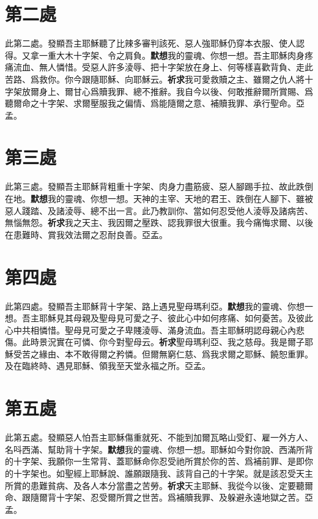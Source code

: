 \section*{第二處}
此第二處。發顯吾主耶穌聽了比辣多審判該死、惡人強耶穌仍穿本衣服、使人認得。又拿一重大木十字架、令之肩負。\cspace\textbf{默想}我的靈魂、你想一想。吾主耶穌肉身疼痛流血、無人憐惜。受惡人許多淩辱、把十字架放在身上、何等樣喜歡背負、走此苦路、爲救你。你今跟隨耶穌、向耶穌云。\cspace\textbf{祈求}我可愛救贖之主、雖爾之仇人將十字架放爾身上、爾甘心爲贖我罪、總不推辭。我自今以後、何敢推辭爾所賞賜、爲聽爾命之十字架、求爾壓服我之偏情、爲能隨爾之意、補贖我罪、承行聖命。{\cspace}亞孟。

\section*{第三處}
此第三處。發顯吾主耶穌背粗重十字架、肉身力盡筋疲、惡人腳踢手拉、故此跌倒在地。\cspace\textbf{默想}我的靈魂、你想一想。天神的主宰、天地的君王、跌倒在人腳下、雖被惡人踐踏、及諸淩辱、總不出一言。此乃教訓你、當如何忍受他人淩辱及諸病苦、無惱無怨。\cspace\textbf{祈求}我之天主、我因爾之壓跌、認我罪很大很重。我今痛悔求爾、以後在患難時、賞我效法爾之忍耐良善。{\cspace}亞孟。

\section*{第四處}
此第四處。發顯吾主耶穌背十字架、路上遇見聖母瑪利亞。\cspace\textbf{默想}我的靈魂、你想一想。吾主耶穌見其母親及聖母見可愛之子、彼此心中如何疼痛、如何憂苦。及彼此心中共相憐惜。聖母見可愛之子卑賤淩辱、滿身流血。吾主耶穌明認母親心內悲傷。此時景況實在可憐、你今對聖母云。\cspace\textbf{祈求}聖母瑪利亞、我之慈母。我是爾子耶穌受苦之緣由、本不敢得爾之矜憐。但爾無窮仁慈、爲我求爾之耶穌、饒恕重罪。及在臨終時、遇見耶穌、領我至天堂永福之所。{\cspace}亞孟。

\section*{第五處}
此第五處。發顯惡人怕吾主耶穌傷重就死、不能到加爾瓦略山受釘、雇一外方人、名呌西滿、幫助背十字架。\cspace\textbf{默想}我的靈魂、你想一想。耶穌如今對你說、西滿所背的十字架、我願你一生常背、蓋耶穌命你忍受祂所賞於你的苦、爲補前罪、是即你的十字架也。如聖經上耶穌說、誰願跟隨我、該背自己的十字架。就是該忍受天主所賞的患難貧病、及各人本分當盡之苦勞。\cspace\textbf{祈求}天主耶穌、我從今以後、定要聽爾命、跟隨爾背十字架、忍受爾所賞之世苦。爲補贖我罪、及躲避永遠地獄之苦。{\cspace}亞孟。

